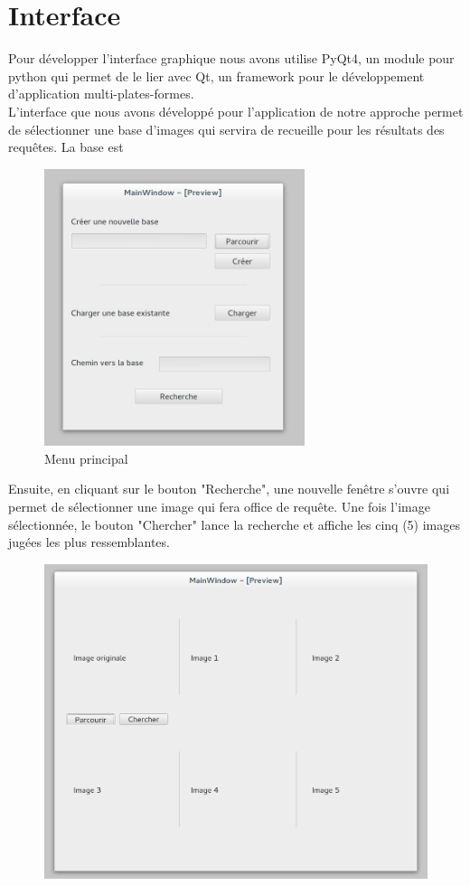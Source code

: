 \section{Interface}

Pour développer l'interface graphique nous avons utilise PyQt4, un module pour python qui permet de le lier avec Qt, un framework pour le développement d'application multi-plates-formes.\\

L'interface que nous avons développé pour l'application de notre approche permet de sélectionner une base d'images qui servira de recueille pour les résultats des requêtes. La base est 


\begin{figure}[H]
	\centering
		\includegraphics[width=3in]{Figures/mainMenu.png}
	\caption[Menu principal]{Menu principal}
	\label{fig:Electron}
\end{figure}


Ensuite, en cliquant sur le bouton "Recherche", une nouvelle fenêtre s'ouvre qui permet de sélectionner une image qui fera office de requête. Une fois l'image sélectionnée, le bouton "Chercher" lance la recherche et affiche les cinq (5) images jugées les plus ressemblantes. 


\begin{figure}[H]
	\centering
		\includegraphics[width=5in]{Figures/search.png}
	\caption[]{}
	\label{fig:Electron}
\end{figure}

